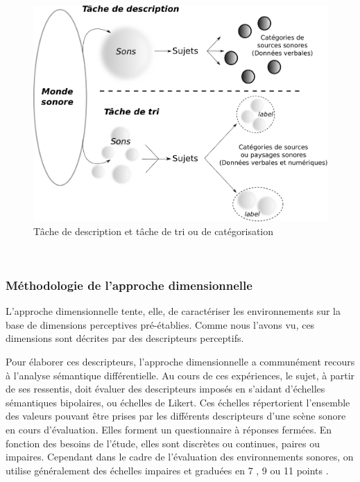 \begin{figure}[t]
        \myfloatalign
        \includegraphics[width=.8\linewidth]{gfx/desCat}
        \caption{Tâche de description et tâche de tri ou de catégorisation}\label{fig:descat}
\end{figure}

 \\

\subsubsection{Méthodologie de l'approche dimensionnelle}
\label{sec:appDimensionelle}

L'approche dimensionnelle tente, elle, de caractériser les environnements sur la base de dimensions perceptives pré-établies. Comme nous l'avons vu, ces dimensions sont décrites par des descripteurs perceptifs.

Pour élaborer ces descripteurs, l'approche dimensionnelle a communément recours à l'analyse sémantique différentielle. Au cours de ces expériences, le sujet, à partir de ses ressentis, doit évaluer des descripteurs imposés en s'aidant d'échelles sémantiques bipolaires, ou échelles de Likert. Ces échelles répertorient l'ensemble des valeurs pouvant être prises par les différents descripteurs d'une scène sonore en cours d'évaluation. Elles forment un questionnaire à réponses fermées. En fonction des besoins de l'étude, elles sont discrètes ou continues, paires ou impaires. Cependant dans le cadre de l'évaluation des environnements sonores, on utilise généralement des échelles impaires et graduées en 7 \citep{raimbault2006qualitative}, 9 \citep{hall2013exploratory} ou 11 points \citep{ricciardi2015sound}.

